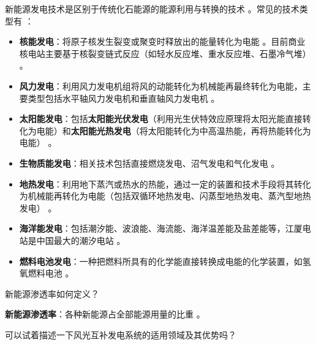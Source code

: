 \begin{solution}
新能源发电技术是区别于传统化石能源的能源利用与转换的技术 。常见的技术类型有 ：
\begin{itemize}
\item \textbf{核能发电}：将原子核发生裂变或聚变时释放出的能量转化为电能 。目前商业核电站主要基于核裂变链式反应（如轻水反应堆、重水反应堆、石墨冷气堆） 。
\item \textbf{风力发电}：利用风力发电机组将风的动能转化为机械能再最终转化为电能，主要类型包括水平轴风力发电机和垂直轴风力发电机 。
\item \textbf{太阳能发电}：包括\textbf{太阳能光伏发电}（利用光生伏特效应原理将太阳光能直接转化为电能）和\textbf{太阳能光热发电}（将太阳能转化为中高温热能，再将热能转化为电能） 。
\item \textbf{生物质能发电}：相关技术包括直接燃烧发电、沼气发电和气化发电 。
\item \textbf{地热发电}：利用地下蒸汽或热水的热能，通过一定的装置和技术手段将其转化为机械能再转化为电能（包括双循环地热发电、闪蒸型地热发电、蒸汽型地热发电） 。
\item \textbf{海洋能发电}：包括潮汐能、波浪能、海流能、海洋温差能及盐差能等，江厦电站是中国最大的潮汐电站 。
\item \textbf{燃料电池发电}：一种把燃料所具有的化学能直接转换成电能的化学装置，如氢氧燃料电池 。
\end{itemize}
\end{solution}

\begin{problem}\label{exer:think_01_intro_09}
新能源渗透率如何定义？
\end{problem}

\begin{solution}
\textbf{新能源渗透率}：各种新能源占全部能源用量的比重 。
\end{solution}

\begin{problem}\label{exer:think_01_intro_10}
可以试着描述一下风光互补发电系统的适用领域及其优势吗？
\end{problem}

